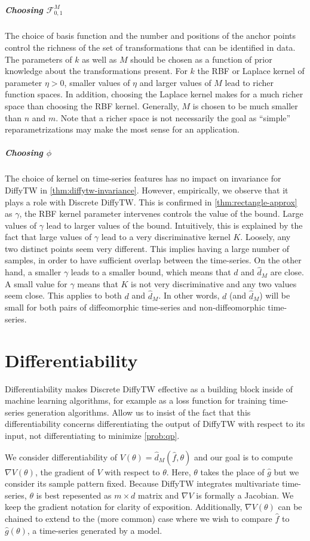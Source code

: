 \subparagraph{Choosing $\mathcal F_{0,1}^M$} The choice of basis function and the number and positions of the anchor points control the richness of the set of transformations that can be identified in data. The parameters of $k$ as well as $M$ should be chosen as a function of prior knowledge about the transformations present. For $k$ the RBF or Laplace kernel of parameter $\eta>0$, smaller values of $\eta$ and larger values of $M$ lead to richer function spaces. In addition, choosing the Laplace kernel makes for a much richer space than choosing the RBF kernel\cite{shawe-taylor2004}. Generally, $M$ is chosen to be much smaller than $n$ and $m$. Note that a richer space is not necessarily the goal as ``simple'' reparametrizations may make the most sense for an application.

\subparagraph{Choosing $\phi$} The choice of kernel on time-series features has no impact on invariance for DiffyTW in \cref{thm:diffytw-invariance}. However, empirically, we observe that it plays a role with Discrete DiffyTW. This is confirmed in \cref{thm:rectangle-approx} as $\gamma$, the RBF kernel parameter intervenes controls the value of the bound. Large values of $\gamma$ lead to larger values of the bound. Intuitively, this is explained by the fact that large values of $\gamma$ lead to a very discriminative kernel $K$. Loosely, any two distinct points seem very different. This implies having a large number of samples, in order to have sufficient overlap between the time-series. On the other hand, a smaller $\gamma$ leads to a smaller bound, which means that $d$ and $\hat d_M$ are close. A small value for $\gamma$ means that $K$ is not very discriminative and any two values seem close. This applies to both $d$ and $\hat d_M$. In other words, $d$ (and $\hat d_M$) will be small for both pairs of diffeomorphic time-series and non-diffeomorphic time-series.

\section{Differentiability}
Differentiability makes Discrete DiffyTW effective as a building block inside of machine learning algorithms, for example as a loss function for training time-series generation algorithms. Allow us to insist of the fact that this differentiability concerns differentiating the output of DiffyTW with respect to its input, not differentiating to minimize \cref{prob:qp}.

We consider differentiability of $V(\theta) = \hat d_M(\hat f, \theta)$ and our goal is to compute $\nabla V(\theta)$, the gradient of $V$ with respect to $\theta$. Here, $\theta$ takes the place of $\hat g$ but we consider its sample pattern fixed. Because DiffyTW integrates multivariate time-series, $\theta$ is best repesented as $m \times d$ matrix and $\nabla V$ is formally a Jacobian. We keep the gradient notation for clarity of exposition. Additionally, $\nabla V(\theta)$ can be chained to extend to the (more common) case where we wish to compare $\hat f$ to $\hat g(\theta)$, a time-series generated by a model.

